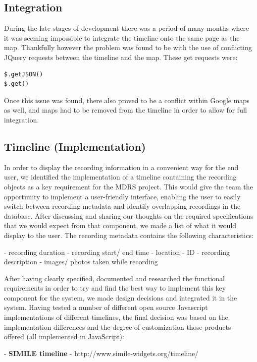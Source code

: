 \documentclass{l3proj}
\begin{document}
\subsection{Integration}

During the late stages of development there was a period of many months where it was seeming impossible to integrate the timeline onto the same page as the map. Thankfully however the problem was found to be with the use of conflicting JQuery requests between the timeline and the map. These get requests were:
\begin{verbatim}
$.getJSON()
$.get()
\end{verbatim}
Once this issue was found, there also proved to be a conflict within Google maps as well, and maps had to be removed from the timeline in order to allow for full integration.

\subsection{Timeline (Implementation)}

In order to display the recording information in a convenient way for the end user, we identified the implementation of a timeline containing the recording objects as a key requirement for the MDRS project. This would give the team the opportunity to implement a user-friendly interface, enabling the user to easily switch between recording metadata and identify overlapping recordings in the database. After discussing and sharing our thoughts on the required specifications that we would expect from that component, we made a list of what it would display to the user. The recording metadata contains the following characteristics:

- recording duration
- recording start/ end time
- location
- ID
- recording description
- images/ photos taken while recording

After having clearly specified, documented and researched the functional requirements in order to try and find the best way to implement this key component for the system, we made design decisions and integrated it in the system. Having tested a number of different open source Javascript implementations of different timelines, the final decision was based on the implementation differences and the degree of customization those products offered (all implemented in JavaScript):


- \textbf{SIMILE timeline} - http://www.simile-widgets.org/timeline/
\end{document}
